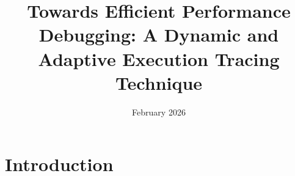 \documentclass{article}
\title{Towards Efficient Performance Debugging: A Dynamic and Adaptive Execution Tracing Technique}
\author{ }
\date{February 2026}
\begin{document}
\maketitle

\section{Introduction}
\end{document}
